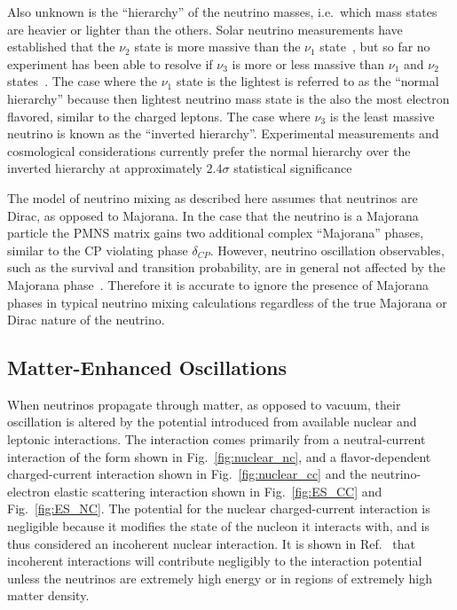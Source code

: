 Also unknown is the ``hierarchy'' of the neutrino masses, i.e.\ which
mass states are heavier or lighter than the others.
Solar neutrino measurements have established that the $\nu_{2}$ state
is more massive than the $\nu_{1}$ state~\citep{sno_first, sno_combined}, but so far no experiment has been
able to resolve if $\nu_{3}$ is more or less massive than $\nu_{1}$ and $\nu_{2}$ states~\citep{vogel_hierarchy}.
The case where the $\nu_{1}$ state is the lightest is referred to as the
``normal hierarchy'' because then lightest neutrino mass state 
is the also the most electron flavored, similar to the charged leptons.
The case where $\nu_{3}$ is the least massive neutrino is known as the
``inverted hierarchy''.
 Experimental measurements and cosmological considerations currently prefer
 the normal hierarchy over the inverted hierarchy at approximately $2.4\sigma$ statistical
 significance~\citep{nu_fit}

The model of neutrino mixing as described here assumes that neutrinos are Dirac, as opposed to
Majorana. In the case that the neutrino is a Majorana particle the PMNS matrix
gains two additional complex ``Majorana'' phases, similar to the CP violating
phase $\delta_{CP}$.
However, neutrino oscillation observables, such as the survival and transition
probability, are in general not affected by the Majorana phase~\citep{majorana_mixing}.
Therefore it is accurate to ignore the presence of Majorana phases in typical 
neutrino mixing calculations regardless of the true Majorana or Dirac nature of the neutrino.

\subsection{Matter-Enhanced Oscillations}
When neutrinos propagate through matter, as opposed to vacuum, their oscillation is altered
by the potential introduced from available nuclear and leptonic interactions.
The interaction comes primarily from a neutral-current interaction of the form
shown in Fig.~\ref{fig:nuclear_nc}, and a flavor-dependent charged-current interaction shown in
Fig.~\ref{fig:nuclear_cc} and the  neutrino-electron elastic scattering interaction shown in
Fig.~\ref{fig:ES_CC} and Fig.~\ref{fig:ES_NC}.
The potential for the nuclear charged-current interaction is negligible
because it modifies the state of the nucleon it interacts with,
and is thus considered an incoherent nuclear interaction.
It is shown in Ref.~\citep{wolfenstein_osc} that incoherent interactions
will contribute negligibly to the interaction potential unless the neutrinos
are extremely high energy or in regions of extremely high matter density.

